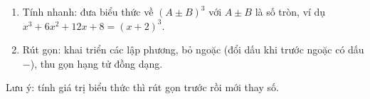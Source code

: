 \begin{enumerate}
\item Tính nhanh: đưa biểu thức về $(A\pm B)^3$ với $A\pm B$ là số tròn, ví dụ $x^3+6x^2+12x+8=(x+2)^3$.
\item Rút gọn: khai triển các lập phương, bỏ ngoặc (đổi dấu khi trước ngoặc có dấu $-$), thu gọn hạng tử đồng dạng.
\end{enumerate}
Lưu ý: tính giá trị biểu thức thì rút gọn trước rồi mới thay số.

